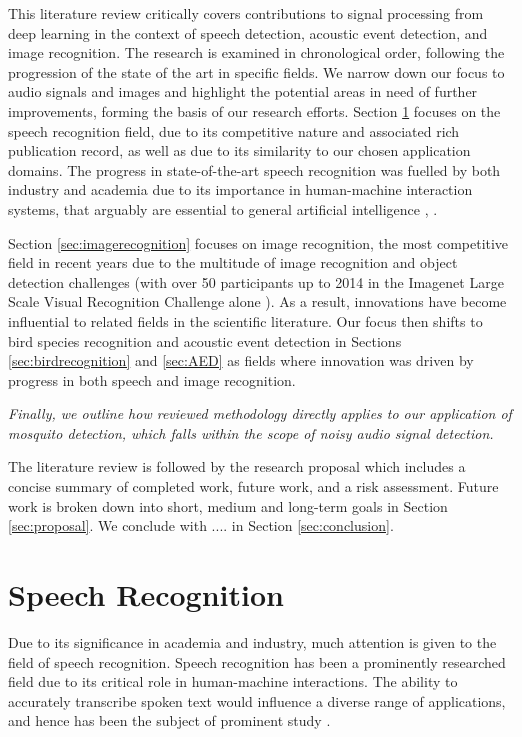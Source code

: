 \documentclass[12pt]{llncs}
\newcommand{\ikn}[1]{\todo[size = \small, color=orange!30]{[ik] #1}}
\begin{document}
This literature review critically covers contributions to signal processing from deep learning in the context of speech detection, acoustic event detection, and image recognition. The research is examined in chronological order, following the progression of the state of the art in specific fields. We narrow down our focus to audio signals and images and highlight the potential areas in need of further improvements\ikn{Need to do this}, forming the basis of our research efforts. Section \ref{sec:speechrecognition} focuses on the speech recognition field, due to its competitive nature and associated rich publication record, as well as due to its similarity to our chosen application domains.\ikn{Which are?} The progress in state-of-the-art speech recognition was fuelled by both industry and academia due to its importance in human-machine interaction systems, that arguably are essential to general artificial intelligence \cite{rabiner1993fundamentals}, \cite{juang2005automatic}.

Section \ref{sec:imagerecognition} focuses on image recognition, the most competitive field in recent years due to the multitude of image recognition and object detection challenges (with over 50 participants up to 2014 in the Imagenet Large Scale Visual Recognition Challenge alone \cite{russakovsky2014imagenet}). As a result, innovations have become influential to related fields in the scientific literature.
Our focus then shifts to bird species recognition and acoustic event detection in Sections \ref{sec:birdrecognition} and \ref{sec:AED} as fields where innovation was driven by progress in both speech and image recognition.


\emph{Finally, we outline how reviewed methodology directly applies to our application of mosquito detection, which falls within the scope of noisy audio signal detection.} \ikn{To do}

The literature review is followed by the research proposal which includes a concise summary of completed work, future work, and a risk assessment. Future work is broken down into short, medium and long-term goals in Section \ref{sec:proposal}. We conclude with .... in Section \ref{sec:conclusion}.



\section{Speech Recognition}
\label{sec:speechrecognition}
Due to its significance in academia and industry, much attention is given to the field of speech recognition. Speech recognition has been a prominently researched field due to its critical role in human-machine interactions. The ability to accurately transcribe spoken text would influence a diverse range of applications, and hence has been the subject of prominent study \cite{juang2005automatic}. 
\end{document}
